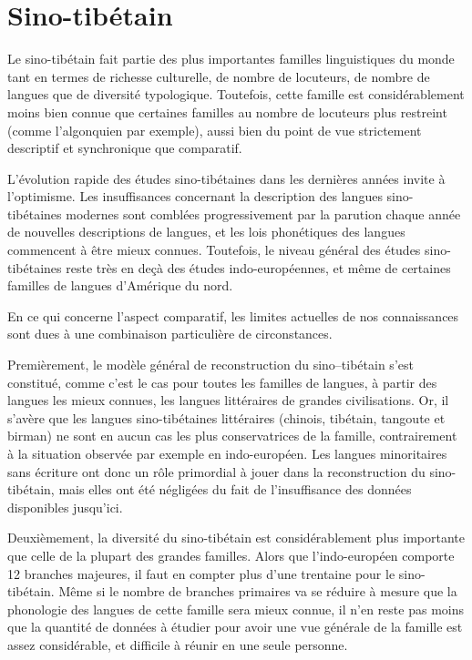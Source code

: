 \documentclass[oldfontcommands,oneside,a4paper,11pt]{memoir}
\begin{document}
\section{Sino-tibétain}
Le  sino-tibétain fait partie des plus importantes familles linguistiques du monde tant   en termes de richesse culturelle, de nombre de locuteurs, de nombre de langues que de diversité typologique. Toutefois, cette famille est considérablement moins bien connue que certaines familles au nombre de locuteurs plus restreint (comme l'algonquien par exemple), aussi bien du point de vue strictement descriptif et synchronique  que comparatif.

L'évolution rapide des études sino-tibétaines dans les dernières années invite à l'optimisme. Les insuffisances concernant la description des langues sino-tibétaines modernes sont comblées progressivement par la parution chaque année de nouvelles descriptions de langues, et les lois phonétiques des langues commencent à être mieux connues. Toutefois, le niveau général des études sino-tibétaines reste très en deçà des études indo-européennes, et même de certaines familles de langues d'Amérique du nord.

En ce qui concerne l'aspect comparatif, les limites actuelles de nos connaissances sont dues à une combinaison particulière de circonstances. 

Premièrement, le modèle général de reconstruction du sino--tibétain s'est constitué, comme c'est le cas pour toutes les familles de langues, à partir des langues les mieux connues, les langues littéraires de grandes civilisations. Or, il s'avère  que les langues sino-tibétaines littéraires (chinois, tibétain, tangoute et birman) ne sont en aucun cas  les plus conservatrices de la famille, contrairement à la situation observée par exemple en indo-européen. Les langues   minoritaires sans écriture ont donc un rôle primordial à jouer dans la reconstruction du sino-tibétain, mais elles ont été négligées du fait de l'insuffisance des données disponibles jusqu'ici.

Deuxièmement, la diversité du sino-tibétain est considérablement plus importante que celle de la plupart des grandes familles. Alors que l'indo-européen comporte 12 branches majeures, il faut en compter plus d'une trentaine pour le sino-tibétain. Même si le nombre de branches primaires va se réduire à mesure que la phonologie des langues de cette famille sera mieux connue, il n'en reste pas moins que la quantité de données à étudier pour avoir une vue générale de la famille est assez considérable, et difficile à réunir en une seule personne.
\end{document}
